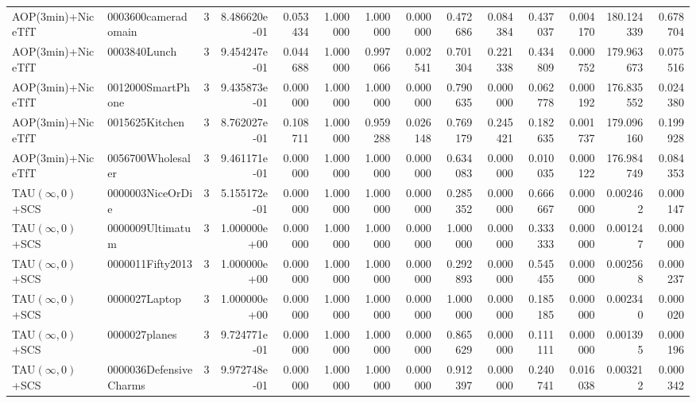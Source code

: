\begin{tabular}{llrr|r|rr|rr|rr|rrr}
        AOP(3min)+NiceTfT &    0003600cameradomain &       3 & 8.486620e-01 & 0.053434 & 1.000000 &      1.000000 & 0.000000 &      0.472686 & 0.084384 &      0.437037 &    0.004170 &   180.124339 &    0.678704 \\
        AOP(3min)+NiceTfT &           0003840Lunch &       3 & 9.454247e-01 & 0.044688 & 1.000000 &      0.997066 & 0.002541 &      0.701304 & 0.221338 &      0.434809 &    0.000752 &   179.963673 &    0.075516 \\
        AOP(3min)+NiceTfT &      0012000SmartPhone &       3 & 9.435873e-01 & 0.000000 & 1.000000 &      1.000000 & 0.000000 &      0.790635 & 0.000000 &      0.062778 &    0.000192 &   176.835552 &    0.024380 \\
        AOP(3min)+NiceTfT &         0015625Kitchen &       3 & 8.762027e-01 & 0.108711 & 1.000000 &      0.959288 & 0.026148 &      0.769179 & 0.245421 &      0.182635 &    0.001737 &   179.096160 &    0.199928 \\
        AOP(3min)+NiceTfT &      0056700Wholesaler &       3 & 9.461171e-01 & 0.000000 & 1.000000 &      1.000000 & 0.000000 &      0.634083 & 0.000000 &      0.010035 &    0.000122 &   176.984749 &    0.084353 \\
     TAU$(\infty, 0)$+SCS &       0000003NiceOrDie &       3 & 5.155172e-01 & 0.000000 & 1.000000 &      1.000000 & 0.000000 &      0.285352 & 0.000000 &      0.666667 &    0.000000 &     0.002462 &    0.000147 \\
     TAU$(\infty, 0)$+SCS &       0000009Ultimatum &       3 & 1.000000e+00 & 0.000000 & 1.000000 &      1.000000 & 0.000000 &      1.000000 & 0.000000 &      0.333333 &    0.000000 &     0.001247 &    0.000000 \\
     TAU$(\infty, 0)$+SCS &       0000011Fifty2013 &       3 & 1.000000e+00 & 0.000000 & 1.000000 &      1.000000 & 0.000000 &      0.292893 & 0.000000 &      0.545455 &    0.000000 &     0.002568 &    0.000237 \\
     TAU$(\infty, 0)$+SCS &          0000027Laptop &       3 & 1.000000e+00 & 0.000000 & 1.000000 &      1.000000 & 0.000000 &      1.000000 & 0.000000 &      0.185185 &    0.000000 &     0.002340 &    0.000020 \\
     TAU$(\infty, 0)$+SCS &          0000027planes &       3 & 9.724771e-01 & 0.000000 & 1.000000 &      1.000000 & 0.000000 &      0.865629 & 0.000000 &      0.111111 &    0.000000 &     0.001395 &    0.000196 \\
     TAU$(\infty, 0)$+SCS & 0000036DefensiveCharms &       3 & 9.972748e-01 & 0.000000 & 1.000000 &      1.000000 & 0.000000 &      0.912397 & 0.000000 &      0.240741 &    0.016038 &     0.003212 &    0.000342 \\

\end{tabular}
